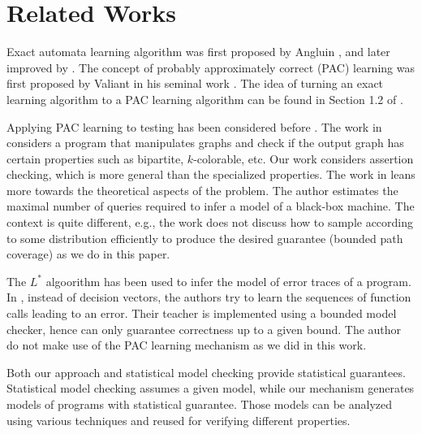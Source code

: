 \chapter{Related Works}\label{ch:related}

Exact automata learning algorithm was first proposed by Angluin \cite{Angluin87}, and later improved by \cite{Angluin87,RivestS93,KearnsV94,BolligHKL09}. The concept of probably approximately correct (PAC) learning was first proposed by Valiant in his seminal work \cite{Valiant84}. The idea of turning an exact learning algorithm to a PAC learning algorithm can be found in Section 1.2 of \cite{Angluin88}.

Applying PAC learning to testing has been considered before \cite{Walkinshaw11,GoldreichGR98}. The work in \cite{GoldreichGR98} considers a program that manipulates graphs and check if the output graph has certain properties such as bipartite, $k$-colorable, etc. Our work considers assertion checking, which is more general than the specialized properties. The work in \cite{Walkinshaw11} leans more towards the theoretical aspects of the problem. The author estimates the maximal number of queries required to infer a model of a black-box machine. The context is quite different, e.g., the work does not discuss how to sample according to some distribution efficiently to produce the desired guarantee (bounded path coverage) as we do in this paper. 

The $L^\ast$ algoorithm has been used to infer the model of error traces of a program. In \cite{ChapmanCKKST15}, instead of decision vectors, the authors try to learn the sequences of function calls leading to an error. Their teacher is implemented using a bounded model checker, hence can only guarantee correctness up to a given bound. The author do not make use of the PAC learning mechanism as we did in this work. 

Both our approach and statistical model checking \cite{SenVA04,LegayDB10,ZulianiPC13} provide statistical guarantees. Statistical model checking assumes a given model, while our mechanism generates models of programs with statistical guarantee. Those models can be analyzed using various techniques and reused for verifying different properties.


